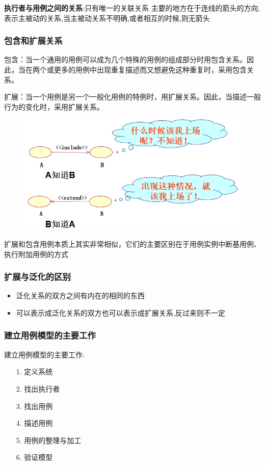 \documentclass[UTF8,a4paper]{ctexart}
\begin{document}
\textbf{执行者与用例之间的关系}:只有唯一的关联关系
主要的地方在于连线的箭头的方向,表示主被动的关系,当主被动关系不明确,或者相互的时候,则无箭头


\subsubsection{包含和扩展关系}

包含：当一个通用的用例可以成为几个特殊的用例的组成部分时用包含关系。因此，当在两个或更多的用例中出现重复描述而又想避免这种重复时，采用包含关系。

扩展：当一个用例是另一个一般化用例的特例时，用扩展关系。因此，当描述一般行为的变化时，采用扩展关系。

\begin{figure}[H]
  \centering
  \includegraphics[scale = 0.3]{assets/SoftwareEngineering_7ddd5.png}
\end{figure}

扩展和包含用例本质上其实非常相似，它们的主要区别在于用例实例中断基用例、执行附加用例的方式

\subsubsection{扩展与泛化的区别}
\begin{itemize}
  \item 泛化关系的双方之间有内在的相同的东西
  \item 可以表示成泛化关系的双方也可以表示成扩展关系,反过来则不一定
\end{itemize}

\subsubsection{建立用例模型的主要工作}
建立用例模型的主要工作:
\begin{itemize}
  \item [1.]定义系统
  \item[2.]找出执行者
  \item[3.]找出用例
  \item[4.]描述用例
  \item[5.]用例的整理与加工
  \item[6.]验证模型
\end{itemize}
\end{document}
